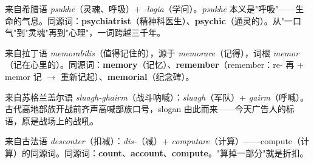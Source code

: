 \documentclass[../main.tex]{subfiles}
\begin{document}



\begin{origin}
来自希腊语 \textit{psukhē}（灵魂、呼吸）+ \textit{-logia}（学问）。\textit{psukhē} 本义是"呼吸"——生命的气息。同源词：\textbf{psychiatrist}（精神科医生）、\textbf{psychic}（通灵的）。从"一口气"到"灵魂"再到"心理"，一词跨越三千年。
\end{origin}



\begin{origin}
来自拉丁语 \textit{memorabilis}（值得记住的），源于 \textit{memorare}（记得），词根 \textit{memor}（记在心里的）。同源词：\textbf{memory}（记忆）、\textbf{remember}（remember：re- 再 + memor 记 $\to$ 重新记起）、\textbf{memorial}（纪念碑）。
\end{origin}



\begin{origin}
来自苏格兰盖尔语 \textit{sluagh-ghairm}（战斗呐喊）：\textit{sluagh}（军队）+ \textit{gairm}（呼喊）。古代高地部族开战前齐声高喊部族口号，slogan 由此而来——今天广告人的标语，原是战场上的战吼。
\end{origin}




\begin{origin}
来自古法语 \textit{desconter}（扣减）：\textit{dis-}（减）+ \textit{computare}（计算）——compute（计算）的同源词。同源词：\textbf{count}、\textbf{account}、\textbf{compute}。"算掉一部分"就是折扣。
\end{origin}
\end{document}
